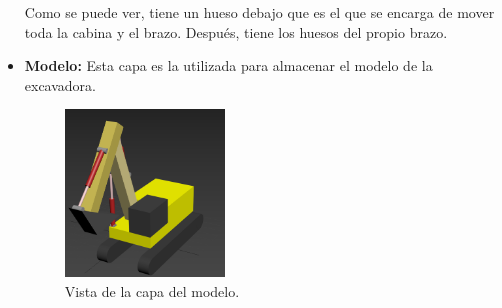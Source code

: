 \begin{itemize}
    Como se puede ver, tiene un hueso debajo que es el que se encarga de mover toda la cabina y el brazo. Después, tiene los huesos del propio brazo.

    \newpage

    \item \textbf{Modelo: }Esta capa es la utilizada para almacenar el modelo de la excavadora.
    
    \begin{figure}[H]
        \centering
        \includegraphics[width=0.4\textwidth]{imagenes/modelocapa.png}
        \caption{Vista de la capa del modelo.}
     \end{figure}
\end{itemize}